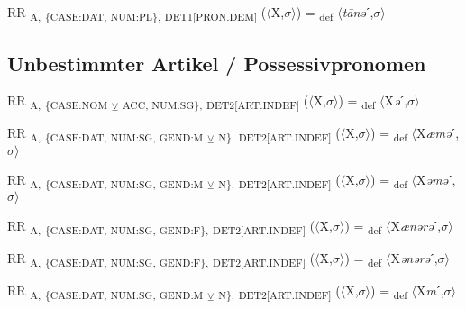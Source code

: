 {\begin{exe}
 RR \textsubscript{A,} \textsubscript{\{CASE:DAT, NUM:PL\},} \textsubscript{DET1[PRON.DEM]} ($\langle$X,$\sigma $$\rangle$) = \textsubscript{def} $\langle$\textit{t\=anə}ˊ,$\sigma $$\rangle$
\end{exe}

\subsection{Unbestimmter Artikel / Possessivpronomen}

\begin{exe}
 RR \textsubscript{A,} \textsubscript{\{CASE:NOM} \textsubscript{${\veebar}$}\textsubscript{ ACC, NUM:SG\},} \textsubscript{DET2[ART.INDEF]} ($\langle$X,$\sigma $$\rangle$) = \textsubscript{def} $\langle$X\textit{ə}ˊ,$\sigma $$\rangle$
\end{exe}

\begin{exe}
 RR \textsubscript{A,} \textsubscript{\{CASE:DAT, NUM:SG, GEND:M} \textsubscript{${\veebar}$}\textsubscript{ N\},} \textsubscript{DET2[ART.INDEF]} ($\langle$X,$\sigma $$\rangle$) = \textsubscript{def} $\langle$X\textit{æmə}ˊ,$\sigma $$\rangle$
\end{exe}

\begin{exe}
 RR \textsubscript{A,} \textsubscript{\{CASE:DAT, NUM:SG, GEND:M} \textsubscript{${\veebar}$}\textsubscript{ N\},} \textsubscript{DET2[ART.INDEF]} ($\langle$X,$\sigma $$\rangle$) = \textsubscript{def} $\langle$X\textit{əmə}ˊ,$\sigma $$\rangle$
\end{exe}

\begin{exe}
 RR \textsubscript{A,} \textsubscript{\{CASE:DAT, NUM:SG, GEND:F\},} \textsubscript{DET2[ART.INDEF]} ($\langle$X,$\sigma $$\rangle$) = \textsubscript{def} $\langle$X\textit{ænərə}ˊ,$\sigma $$\rangle$
\end{exe}

\begin{exe}
 RR \textsubscript{A,} \textsubscript{\{CASE:DAT, NUM:SG, GEND:F\},} \textsubscript{DET2[ART.INDEF]} ($\langle$X,$\sigma $$\rangle$) = \textsubscript{def} $\langle$X\textit{ənərə}ˊ,$\sigma $$\rangle$
\end{exe}

\begin{exe}
 RR \textsubscript{A,} \textsubscript{\{CASE:DAT, NUM:SG, GEND:M} \textsubscript{${\veebar}$}\textsubscript{ N\},} \textsubscript{DET2[ART.INDEF]} ($\langle$X,$\sigma $$\rangle$) = \textsubscript{def} $\langle$X\textit{m}ˊ,$\sigma $$\rangle$
\end{exe}

}
